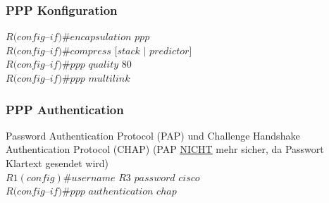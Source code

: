 \documentclass[landscape,twocolumn,a4paper]{article}
\begin{document}
\begin{footnotesize}
\subsubsection{PPP Konfiguration}
$R(config$--$if)\#encapsulation$ $ppp$\\
$R(config$--$if)\#compress$ $[stack$ $|$ $predictor]$\\
$R(config$--$if)\#ppp$ $quality$ $80$\\
$R(config$--$if)\#ppp$ $multilink$

\subsubsection{PPP Authentication}
Password Authentication Protocol (PAP) und Challenge Handshake Authentication Protocol (CHAP) (PAP \underline{NICHT} mehr sicher, da Passwort Klartext gesendet wird)\\
$R1(config)\#username$ $R3$ $password$ $cisco$\\
$R(config$--$if)\#ppp$ $authentication$ $chap$



\end{footnotesize}
\end{document}
